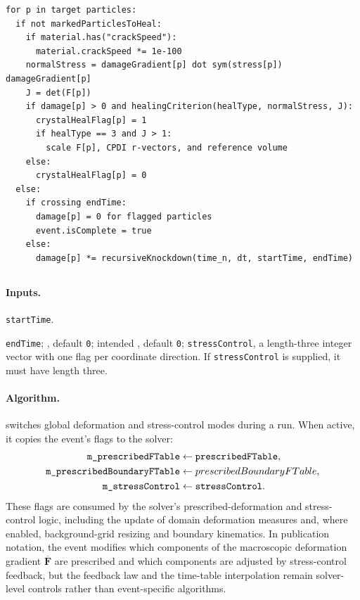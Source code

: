\begin{lstlisting}[caption={CrystalHeal event pseudocode.}]
for p in target particles:
  if not markedParticlesToHeal:
    if material.has("crackSpeed"):
      material.crackSpeed *= 1e-100
    normalStress = damageGradient[p] dot sym(stress[p]) damageGradient[p]
    J = det(F[p])
    if damage[p] > 0 and healingCriterion(healType, normalStress, J):
      crystalHealFlag[p] = 1
      if healType == 3 and J > 1:
        scale F[p], CPDI r-vectors, and reference volume
    else:
      crystalHealFlag[p] = 0
  else:
    if crossing endTime:
      damage[p] = 0 for flagged particles
      event.isComplete = true
    else:
      damage[p] *= recursiveKnockdown(time_n, dt, startTime, endTime)
\end{lstlisting}

\subsection{}
\label{subsec:event-deformation-update}

\paragraph{Inputs.}
\begin{description}[leftmargin=*,style=nextline]
\item[\textbf{Required.}] \texttt{startTime}.
\item[\textbf{Optional.}] \texttt{endTime}; , default \texttt{0}; intended , default \texttt{0}; \texttt{stressControl}, a length-three integer vector with one flag per coordinate direction.  If \texttt{stressControl} is supplied, it must have length three.
\end{description}

\paragraph{Algorithm.}
 switches global deformation and stress-control modes during a run.  When active, it copies the event's flags to the solver:
\begin{align}
  \texttt{m\_prescribedFTable}&\leftarrow\texttt{prescribedFTable},\\
  \texttt{m\_prescribedBoundaryFTable}&\leftarrow prescribedBoundaryFTable,\\
  \texttt{m\_stressControl}&\leftarrow\texttt{stressControl}.
\end{align}
These flags are consumed by the solver's prescribed-deformation and stress-control logic, including the update of domain deformation measures and, where enabled, background-grid resizing and boundary kinematics.  In publication notation, the event modifies which components of the macroscopic deformation gradient $\overline{\mathbf{F}}$ are prescribed and which components are adjusted by stress-control feedback, but the feedback law and the time-table interpolation remain solver-level controls rather than event-specific algorithms.

